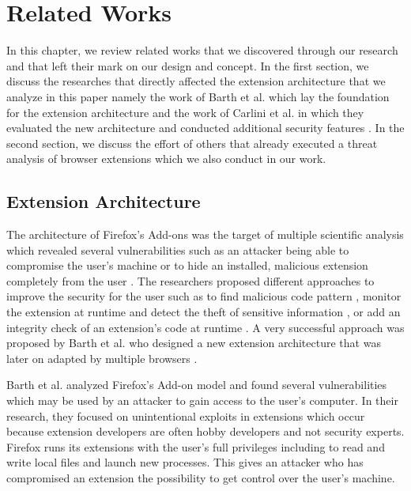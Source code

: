 
\chapter{Related Works}

	In this chapter, we review related works that we discovered through our research and that left their mark on our design and concept. In the first section, we discuss the researches that directly affected the extension architecture that we analyze in this paper namely the work of Barth et al. which lay the foundation for the extension architecture and the work of Carlini et al. in which they evaluated the new architecture and conducted additional security features \cite{Barth10protectingbrowsers, Carlini:2012:EGC:2362793.2362800}. In the second section, we discuss the effort of others that already executed a threat analysis of browser extensions which we also conduct in our work.



\section{Extension Architecture} %

	The architecture of Firefox's Add-ons was the target of multiple scientific analysis which revealed several vulnerabilities such as an attacker being able to compromise the user's machine or to hide an installed, malicious extension completely from the user \cite{Bandhakavi:2011:VBE:1995376.1995398, TerLouw:2007:EWB:1420581.1420583}. The researchers proposed different approaches to improve the security for the user such as to find malicious code pattern \cite{Bandhakavi:2011:VBE:1995376.1995398}, monitor the extension at runtime and detect the theft of sensitive information \cite{Dhawan:2009:AIF:1723192.1723250, cs2015sentinel, TerLouw:2007:EWB:1420581.1420583}, or add an integrity check of an extension's code at runtime \cite{TerLouw:2007:EWB:1420581.1420583}. A very successful approach was proposed by Barth et al. who designed a new extension architecture that was later on adapted by multiple browsers \cite{Barth10protectingbrowsers}. 
	
	Barth et al. analyzed Firefox's Add-on model and found several vulnerabilities which may be used by an attacker to gain access to the user's computer. In their research, they focused on unintentional exploits in extensions which occur because extension developers are often hobby developers and not security experts. Firefox runs its extensions with the user's full privileges including to read and write local files and launch new processes. This gives an attacker who has compromised an extension the possibility to get control over the user's machine. 
	
